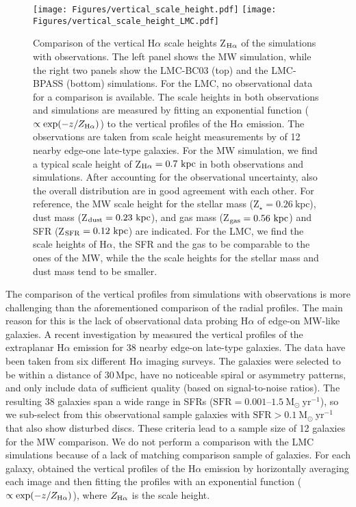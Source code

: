 \documentclass[fleqn,usenatbib]{mnras}
\begin{document}
\begin{figure*}
\texttt{[image: Figures/vertical\_scale\_height.pdf]}
\texttt{[image: Figures/vertical\_scale\_height\_LMC.pdf]}
\caption{Comparison of the vertical H$\alpha$ scale heights Z$_{\rm H\alpha}$ of the simulations with observations. The left panel shows the MW simulation, while the right two panels show the LMC-BC03 (top) and the LMC-BPASS (bottom) simulations. For the LMC, no observational data for a comparison is available. The scale heights in both observations and simulations are measured by fitting an exponential function ($\propto \exp(-z/Z_{\rm H\alpha})$) to the vertical profiles of the H$\alpha$ emission. The observations are taken from scale height measurements by \citet{jo18} of 12 nearby edge-one late-type galaxies. For the MW simulation, we find a typical scale height of Z$_{\rm H\alpha}=0.7~\mathrm{kpc}$ in both observations and simulations. After accounting for the observational uncertainty, also the overall distribution are in good agreement with each other. For reference, the MW scale height for the stellar mass (Z$_{\star}=0.26~\mathrm{kpc}$), dust mass (Z$_{\rm dust}=0.23~\mathrm{kpc}$), and gas mass (Z$_{\rm gas}=0.56~\mathrm{kpc}$) and SFR (Z$_{\rm SFR}=0.12~\mathrm{kpc}$) are indicated. For the LMC, we find the scale heights of H$\alpha$, the SFR and the gas to be comparable to the ones of the MW, while the the scale heights for the stellar mass and dust mass tend to be smaller.}
\label{fig:scaleheight_comparison}
\end{figure*}

The comparison of the vertical profiles from simulations with observations is more challenging than the aforementioned comparison of the radial profiles. The main reason for this is the lack of observational data probing H$\alpha$ of edge-on MW-like galaxies. A recent investigation by \citet{jo18} measured the vertical profiles of the extraplanar H$\alpha$ emission for 38 nearby edge-on late-type galaxies. The data have been taken from six different H$\alpha$ imaging surveys. The galaxies were selected to be within a distance of 30\,Mpc, have no noticeable spiral or asymmetry patterns, and only include data of sufficient quality (based on signal-to-noise ratios). The resulting 38 galaxies span a wide range in SFRs ($\mathrm{SFR}=0.001$--$1.5~\mathrm{M}_{\odot}~\mathrm{yr}^{-1}$), so we sub-select from this observational sample galaxies with $\mathrm{SFR}>0.1~\mathrm{M}_{\odot}~\mathrm{yr}^{-1}$ that also show disturbed discs. These criteria lead to a sample size of 12 galaxies for the MW comparison. We do not perform a comparison with the LMC simulations because of a lack of matching comparison sample of  galaxies. For each galaxy, \citet{jo18} obtained the vertical profiles of the H$\alpha$ emission by horizontally averaging each image and then fitting the profiles with an exponential function ($\propto \exp(-z/Z_{\rm H\alpha})$), where $Z_{\rm H\alpha}$ is the scale height.
\end{document}

